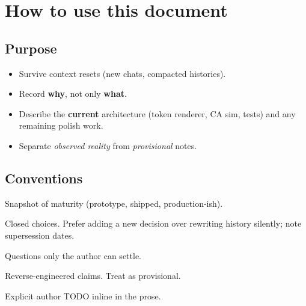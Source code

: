 \section{How to use this document}
\label{sec:how-to-use}

\subsection{Purpose}
\begin{itemize}
  \item Survive context resets (new chats, compacted histories).
  \item Record \textbf{why}, not only \textbf{what}.
  \item Describe the \textbf{current} architecture (token renderer, CA sim, tests)
        and any remaining polish work.
  \item Separate \emph{observed reality} from \emph{provisional} notes.
\end{itemize}

\subsection{Conventions}
\begin{description}[style=nextline]
  \item[Status boxes]
    Snapshot of maturity (prototype, shipped, production-ish).
  \item[Decision boxes]
    Closed choices. Prefer adding a new decision over rewriting history silently;
    note supersession dates.
  \item[Open boxes]
    Questions only the author can settle.
  \item[Inference boxes]
    Reverse-engineered claims. Treat as provisional.
  \item[\texttt{\textbackslash todoauthor\{...\}}]
    Explicit author TODO inline in the prose.
\end{description}

